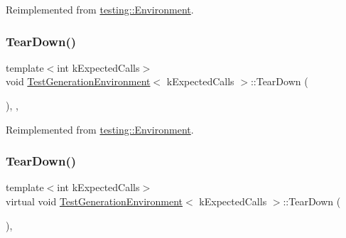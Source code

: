 Reimplemented from \mbox{\hyperlink{classtesting_1_1_environment_a039bdaa705c46b9b88234cf4d3bb6254}{testing\+::\+Environment}}.

\mbox{\label{class_test_generation_environment_af7731d3161d89e3bd456cd204e2c4890}} 
\subsubsection{\texorpdfstring{TearDown()}{TearDown()}\hspace{0.1cm}{\footnotesize\ttfamily [2/3]}}
{\footnotesize\ttfamily template$<$int k\+Expected\+Calls$>$ \\
void \mbox{\hyperlink{class_test_generation_environment}{Test\+Generation\+Environment}}$<$ k\+Expected\+Calls $>$\+::Tear\+Down (\begin{DoxyParamCaption}{ }\end{DoxyParamCaption})\hspace{0.3cm}{\ttfamily [inline]}, {\ttfamily [override]}, {\ttfamily [virtual]}}



Reimplemented from \mbox{\hyperlink{classtesting_1_1_environment_a039bdaa705c46b9b88234cf4d3bb6254}{testing\+::\+Environment}}.

\mbox{\label{class_test_generation_environment_ac3787d8afb43b97b0b3d6dec78b04798}} 
\subsubsection{\texorpdfstring{TearDown()}{TearDown()}\hspace{0.1cm}{\footnotesize\ttfamily [3/3]}}
{\footnotesize\ttfamily template$<$int k\+Expected\+Calls$>$ \\
virtual void \mbox{\hyperlink{class_test_generation_environment}{Test\+Generation\+Environment}}$<$ k\+Expected\+Calls $>$\+::Tear\+Down (\begin{DoxyParamCaption}{ }\end{DoxyParamCaption})\hspace{0.3cm}{\ttfamily [inline]}, {\ttfamily [virtual]}}




